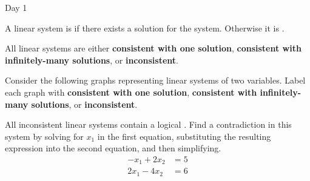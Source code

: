 \begin{applicationActivities}{Day 1}
\begin{definition}
  A linear system is  if there exists a solution for the
  system. Otherwise it is .
\end{definition}

\begin{fact}
  All linear systems are either \textbf{consistent with one solution},
  \textbf{consistent with infinitely-many solutions}, or
  \textbf{inconsistent}.
\end{fact}

\begin{activity}{5}
  Consider the following graphs representing linear systems of two variables.
  Label each graph with \textbf{consistent with one solution},
  \textbf{consistent with infinitely-many solutions}, or
  \textbf{inconsistent}.
  \begin{multicols}{4}
  \begin{center}
    \systemWithInfinitelyManySolutions
    \systemWithOneSolutionB
    \systemWithNoSolutions
    \systemWithOneSolutionA
  \end{center}
  \end{multicols}
\end{activity}

\begin{activity}{10}
  All inconsistent linear systems contain a logical .
  Find a contradiction in this system by solving for \(x_1\) in the first
  equation, substituting the resulting expression into the
  second equation, and then simplifying. %
  \begin{align*}
  -x_1+2x_2  &=  5 \\
  2x_1-4x_2  &=  6
  \end{align*}
\end{activity}


\end{applicationActivities}
